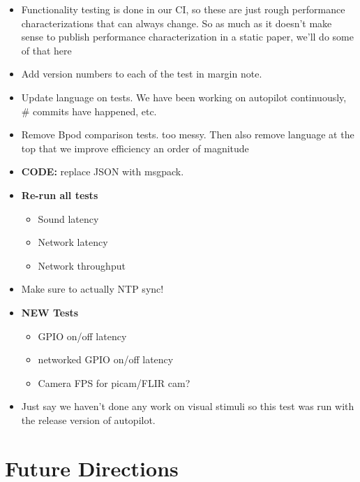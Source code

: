 \begin{itemize}
\item Functionality testing is done in our CI, so these are just rough performance characterizations that can always change. So as much as it doesn't make sense to publish performance characterization in a static paper, we'll do some of that here
\item Add version numbers to each of the test in margin note.
\item Update language on tests. We have been working on autopilot continuously, \# commits have happened, etc.
\item Remove Bpod comparison tests. too messy. Then also remove language at the top that we improve efficiency an order of magnitude
\item \textbf{CODE:} replace JSON with msgpack.
\item \textbf{Re-run all tests} 
\begin{itemize}
\item Sound latency
\item Network latency
\item Network throughput
\end{itemize}
\item Make sure to actually NTP sync!
\item \textbf{NEW Tests}
\begin{itemize}
\item GPIO on/off latency
\item networked GPIO on/off latency
\item Camera FPS for picam/FLIR cam?
\end{itemize}
\item Just say we haven't done any work on visual stimuli so this test was run with the release version of autopilot.

\end{itemize}

\section{Future Directions}

